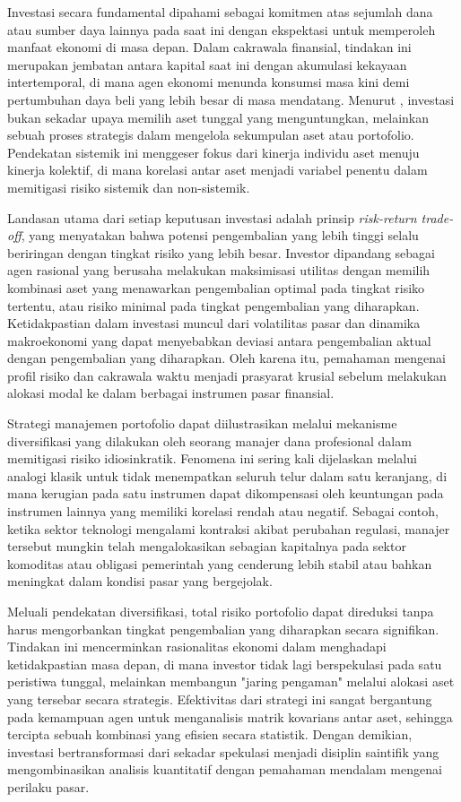 Investasi secara fundamental dipahami sebagai komitmen atas sejumlah dana atau sumber daya lainnya pada saat ini dengan ekspektasi untuk memperoleh manfaat ekonomi di masa depan. Dalam cakrawala finansial, tindakan ini merupakan jembatan antara kapital saat ini dengan akumulasi kekayaan intertemporal, di mana agen ekonomi menunda konsumsi masa kini demi pertumbuhan daya beli yang lebih besar di masa mendatang. Menurut \cite{markowitz_portfolio_1952}, investasi bukan sekadar upaya memilih aset tunggal yang menguntungkan, melainkan sebuah proses strategis dalam mengelola sekumpulan aset atau portofolio. Pendekatan sistemik ini menggeser fokus dari kinerja individu aset menuju kinerja kolektif, di mana korelasi antar aset menjadi variabel penentu dalam memitigasi risiko sistemik dan non-sistemik.

Landasan utama dari setiap keputusan investasi adalah prinsip \textit{risk-return trade-off}, yang menyatakan bahwa potensi pengembalian yang lebih tinggi selalu beriringan dengan tingkat risiko yang lebih besar. Investor dipandang sebagai agen rasional yang berusaha melakukan maksimisasi utilitas dengan memilih kombinasi aset yang menawarkan pengembalian optimal pada tingkat risiko tertentu, atau risiko minimal pada tingkat pengembalian yang diharapkan. Ketidakpastian dalam investasi muncul dari volatilitas pasar dan dinamika makroekonomi yang dapat menyebabkan deviasi antara pengembalian aktual dengan pengembalian yang diharapkan. Oleh karena itu, pemahaman mengenai profil risiko dan cakrawala waktu menjadi prasyarat krusial sebelum melakukan alokasi modal ke dalam berbagai instrumen pasar finansial.

\begin{example}
    Strategi manajemen portofolio dapat diilustrasikan melalui mekanisme diversifikasi yang dilakukan oleh seorang manajer dana profesional dalam memitigasi risiko idiosinkratik. Fenomena ini sering kali dijelaskan melalui analogi klasik untuk tidak menempatkan seluruh telur dalam satu keranjang, di mana kerugian pada satu instrumen dapat dikompensasi oleh keuntungan pada instrumen lainnya yang memiliki korelasi rendah atau negatif. Sebagai contoh, ketika sektor teknologi mengalami kontraksi akibat perubahan regulasi, manajer tersebut mungkin telah mengalokasikan sebagian kapitalnya pada sektor komoditas atau obligasi pemerintah yang cenderung lebih stabil atau bahkan meningkat dalam kondisi pasar yang bergejolak.

    Meluali pendekatan diversifikasi, total risiko portofolio dapat direduksi tanpa harus mengorbankan tingkat pengembalian yang diharapkan secara signifikan. Tindakan ini mencerminkan rasionalitas ekonomi dalam menghadapi ketidakpastian masa depan, di mana investor tidak lagi berspekulasi pada satu peristiwa tunggal, melainkan membangun "jaring pengaman" melalui alokasi aset yang tersebar secara strategis. Efektivitas dari strategi ini sangat bergantung pada kemampuan agen untuk menganalisis matrik kovarians antar aset, sehingga tercipta sebuah kombinasi yang efisien secara statistik. Dengan demikian, investasi bertransformasi dari sekadar spekulasi menjadi disiplin saintifik yang mengombinasikan analisis kuantitatif dengan pemahaman mendalam mengenai perilaku pasar.
\end{example}

